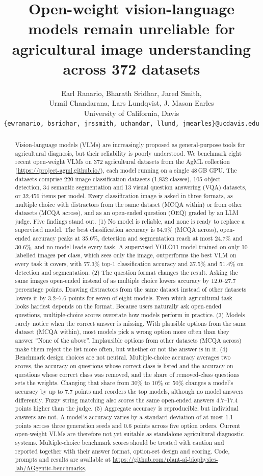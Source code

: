 \documentclass[10pt,letterpaper]{article}
\title{Open-weight vision-language models remain unreliable for agricultural image understanding across 372 datasets}
\author{Earl Ranario, Bharath Sridhar, Jared Smith,\\ Urmil Chandarana, Lars Lundqvist, J. Mason Earles\\[4pt]
University of California, Davis\\
{\small\texttt{\{ewranario, bsridhar, jrssmith, uchandar, llund, jmearles\}@ucdavis.edu}}}
\date{}
\newcommand{\repo}{\url{https://github.com/plant-ai-biophysics-lab/AGgentic-benchmarks}}
\newcommand{\agmlurl}{\url{https://project-agml.github.io/}}
\begin{document}
\maketitle

\begin{abstract}
Vision-language models (VLMs) are increasingly proposed as general-purpose tools for agricultural diagnosis, but their reliability is poorly understood. We benchmark eight recent open-weight VLMs on 372 agricultural datasets from the AgML collection (\agmlurl), each model running on a single 48\,GB GPU. The datasets comprise 220 image classification datasets (1,832 classes), 105 object detection, 34 semantic segmentation and 13 visual question answering (VQA) datasets, or 32,456 items per model. Every classification image is asked in three formats, as multiple choice with distractors from the same dataset (MCQA within) or from other datasets (MCQA across), and as an open-ended question (OEQ) graded by an LLM judge. Five findings stand out. (1) No model is reliable, and none is ready to replace a supervised model. The best classification accuracy is 54.9\% (MCQA across), open-ended accuracy peaks at 35.6\%, detection and segmentation reach at most 24.7\% and 30.6\%, and no model leads every task. A supervised YOLO11 model trained on only 10 labelled images per class, which sees only the image, outperforms the best VLM on every task it covers, with 77.3\% top-1 classification accuracy and 37.5\% and 51.4\% on detection and segmentation. (2) The question format changes the result. Asking the same images open-ended instead of as multiple choice lowers accuracy by 12.0--27.7 percentage points. Drawing distractors from the same dataset instead of other datasets lowers it by 3.2--7.6 points for seven of eight models. Even which agricultural task looks hardest depends on the format. Because users naturally ask open-ended questions, multiple-choice scores overstate how models perform in practice. (3) Models rarely notice when the correct answer is missing. With plausible options from the same dataset (MCQA within), most models pick a wrong option more often than they answer ``None of the above''. Implausible options from other datasets (MCQA across) make them reject the list more often, but whether or not the answer is in it. (4) Benchmark design choices are not neutral. Multiple-choice accuracy averages two scores, the accuracy on questions whose correct class is listed and the accuracy on questions whose correct class was removed, and the share of removed-class questions sets the weights. Changing that share from 30\% to 10\% or 50\% changes a model's accuracy by up to 7.7 points and reorders the top models, although no model answers differently. Fuzzy string matching also scores the same open-ended answers 4.7--17.4 points higher than the judge. (5) Aggregate accuracy is reproducible, but individual answers are not. A model's accuracy varies by a standard deviation of at most 1.1 points across three generation seeds and 0.6 points across five option orders. Current open-weight VLMs are therefore not yet suitable as standalone agricultural diagnostic systems. Multiple-choice benchmark scores should be treated with caution and reported together with their answer format, option-set design and scoring. Code, prompts and results are available at \repo.

\end{abstract}
\end{document}
